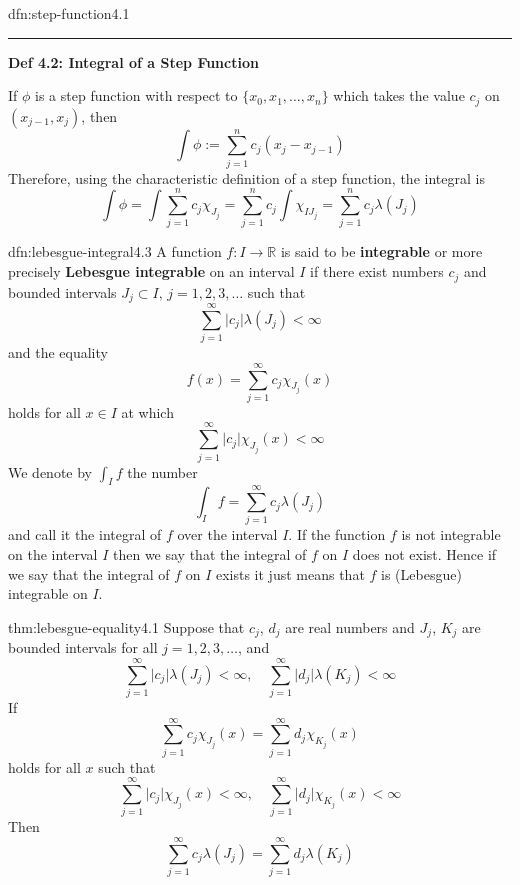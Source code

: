 \documentclass[landscape, 8pt]{extarticle}
\begin{document}
\begin{multicols}{3}
\begin{dfn}{dfn:step-function}{4.1}
	\noindent\rule{\textwidth}{0.2pt}

	\textbf{Def 4.2: Integral of a Step Function}

	If $\phi$ is a step function with respect to $\{x_{0},x_{1},\dots,x_{n}\}$ which takes the value $c_{j}$ on $(x_{j-1},x_{j})$, then
	\[\int \phi := \sum_{j=1}^{n} c_{j}(x_{j}-x_{j-1})\]
	Therefore, using the characteristic definition of a step function, the integral is
	\[\int \phi = \int \sum_{j=1}^{n} c_{j}\chi_{J_{j}}=\sum_{j=1}^{n} c_{j}\int \chi_{IJ_{j}}=\sum_{j=1}^{n} c_{j}\lambda(J_{j})\]
\end{dfn}

\begin{dfn}{dfn:lebesgue-integral}{4.3}
	A function $f:I\to \mathbb{R}$ is said to be \textbf{integrable} or more precisely \textbf{Lebesgue integrable} on an interval $I$ if there exist numbers $c_{j}$ and bounded intervals $J_{j}\subset I,\,j=1,2,3,\dots$ such that
	\[\sum_{j=1}^{\infty} \lvert c_{j} \rvert \lambda(J_{j})<\infty\]
	and the equality
	\[f(x)=\sum_{j=1}^{\infty} c_{j}\chi_{J_{j}}(x)\]
	holds for all $x\in I$ at which
	\[\sum_{j=1}^{\infty} \lvert c_{j} \rvert \chi_{J_{j}}(x)<\infty\]
	We denote by $\int_{I}f$ the number
	\[\int _{I}f=\sum_{j=1}^{\infty} c_{j}\lambda(J_{j})\]
	and call it the integral of $f$ over the interval $I$.
	If the function $f$ is not integrable on the interval $I$ then we say that the integral of $f$ on $I$ does not exist. Hence if we say that the integral of $f$ on $I$ exists it just means that $f$ is (Lebesgue) integrable on $I$.
\end{dfn}

\begin{thm}{thm:lebesgue-equality}{4.1}
	Suppose that $c_{j}$, $d_{j}$ are real numbers and $J_{j}$, $K_{j}$ are bounded intervals for all $j=1,2,3,\dots$, and
	\[\sum_{j=1}^{\infty} \lvert c_{j} \rvert \lambda(J_{j})<\infty,\quad \sum_{j=1}^{\infty} \lvert d_{j} \rvert \lambda(K_{j})<\infty\]
	If
	\[\sum_{j=1}^{\infty} c_{j}\chi_{J_{j}}(x)=\sum_{j=1}^{\infty} d_{j}\chi_{K_{j}}(x)\]
	holds for all $x$ such that
	\[\sum_{j=1}^{\infty} \lvert c_{j} \rvert \chi_{J_{j}}(x)<\infty,\quad \sum_{j=1}^{\infty} \lvert d_{j} \rvert \chi_{K_{j}}(x)<\infty\]
	Then
	\[\sum_{j=1}^{\infty} c_{j}\lambda(J_{j})=\sum_{j=1}^{\infty} d_{j}\lambda(K_{j})\]
\end{thm}


\end{multicols}
\end{document}
